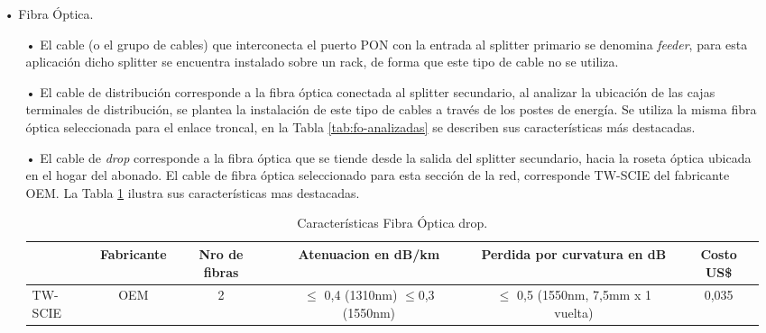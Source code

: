 \begin{enumerate}
\item[•]Fibra Óptica.




\begin{enumerate}
\item[•]El cable (o el grupo de cables) que interconecta el puerto PON con la entrada al splitter primario se denomina \textit{feeder}, para esta aplicación dicho splitter se encuentra instalado sobre un rack, de forma que este tipo de cable no se utiliza.

\item[•]El cable de distribución corresponde a la fibra óptica conectada al splitter secundario, al analizar la ubicación de las cajas terminales de distribución, se plantea la instalación de este tipo de cables a través de los postes de energía.
Se utiliza la misma fibra óptica seleccionada para el enlace troncal, en la Tabla \ref{tab:fo-analizadas} se describen sus características más destacadas.

\item[•]El cable de \textit{drop} corresponde a la fibra óptica que se tiende desde la salida del splitter secundario, hacia la roseta óptica ubicada en el hogar del abonado.
El cable de fibra óptica seleccionado para esta sección de la red, corresponde TW-SCIE del fabricante OEM. La Tabla \ref{tab:fo-drop} ilustra sus características mas destacadas.



\begin{table}[H]
  \tiny
  \centering
    \begin{tabular}{|l|c|c|c|c|c|}
    \hline
    \rowcolor[rgb]{ .773,  .851,  .945} \multicolumn{1}{|c|}{\textbf{Modelo}} & \textbf{Fabricante} & \textbf{Nro de fibras} & \textbf{Atenuacion en dB/km} & \textbf{Perdida por curvatura en dB} & \textbf{Costo US\$} \bigstrut\\
    \hline
        \textcolor[rgb]{ .004,  .004,  .004}{TW-SCIE} & OEM   & 2 & $\leq$ 0,4 (1310nm) $\leq$0,3 (1550nm) & $\leq$ 0,5 (1550nm, 7,5mm x 1 vuelta) & 0,035 \bigstrut\\
    \hline
    \end{tabular}%
	\caption{Características Fibra Óptica drop.}
  \label{tab:fo-drop}%
\end{table}%






\end{enumerate}
\end{enumerate}
